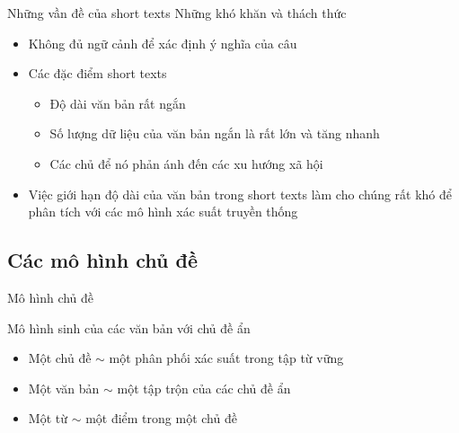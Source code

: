 \documentclass[pdf]{beamer}
\begin{document}
\begin{frame}{Những vần đề của short texts}
	Những khó khăn và thách thức
	\begin{itemize}
		\item Không đủ ngữ cảnh để xác định ý nghĩa của câu
		\item Các đặc điểm short texts
		\begin{itemize}
			\item Độ dài văn bản rất ngắn
			\item Số lượng dữ liệu của văn bản ngắn là rất lớn và tăng nhanh
			\item Các chủ để nó phản ánh đến các xu hướng xã hội
		\end{itemize}
		\item Việc giới hạn độ dài của văn bản trong short texts làm cho chúng rất khó để phân tích với các mô hình xác suất truyền thống
	\end{itemize}

\end{frame}

\subsection{Các mô hình chủ đề}
\begin{frame}{Mô hình chủ đề}
\begin{figure}
\end{figure}
Mô hình sinh của các văn bản với chủ đề ẩn
\begin{itemize}
	\item Một chủ đề $\sim$ một phân phối xác suất trong tập từ vững
	\item Một văn bản $\sim$ một tập trộn của các chủ đề ẩn
	\item Một từ $\sim$ một điểm trong một chủ đề
\end{itemize}	
\end{frame}
\end{document}
